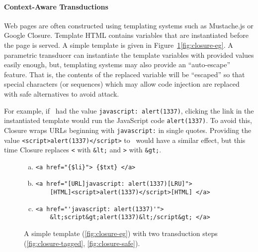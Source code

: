 
\paragraph{Context-Aware Transductions}

Web pages are often constructed using templating systems such as Mustache.js or Google Closure.
Template HTML contains variables that are instantiated before the page is served.
A simple template is given in Figure~\ref{fig:closure}\ref{fig:closure-eg}.
A parametric transducer can instantiate the template variables with provided values easily enough, but, templating systems may also provide an ``auto-escape'' feature.
That is, the contents of the replaced variable will be ``escaped'' so that special characters (or sequences) which may allow code injection are replaced with safe alternatives to avoid attack.

For example, if \linkvar\ had the value \texttt{javascript: alert(1337)}, clicking the link in the instantiated template would run the JavaScript code \texttt{alert(1337)}.
To avoid this, Closure wraps URLs beginning with \texttt{javascript:} in single quotes.
Providing the value \texttt{<script>alert(1337)</script>} to \linktextvar\ would have a similar effect, but this time Closure replaces \texttt{<} with \texttt{\&lt;} and \texttt{>} with \texttt{\&gt;}.

\begin{figure}
\begin{center}
\begin{minipage}{.75\linewidth}
\begin{enumerate}[(a)]
\item \label{fig:closure-eg}
\begin{verbatim}
<a href="{$li}"> {$txt} </a>
\end{verbatim}
\item \label{fig:closure-tagged}
\begin{verbatim}
<a href="[URL]javascript: alert(1337)[LRU]">
    [HTML]<script>alert(1337)</script>[HTML] </a>
\end{verbatim}
\item \label{fig:closure-safe}
\begin{verbatim}
<a href="'javascript: alert(1337)'">
    &lt;script&gt;alert(1337)&lt;/script&gt; </a>
\end{verbatim}
\end{enumerate}
\end{minipage}
\end{center}
\vspace{-3ex}
\caption{\label{fig:closure}A simple template (\ref{fig:closure-eg}) with two transduction steps (\ref{fig:closure-tagged}, \ref{fig:closure-safe}).}
\end{figure}


